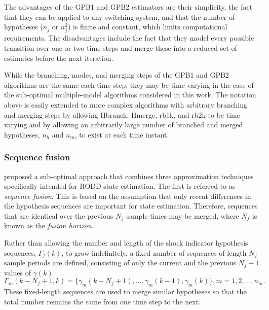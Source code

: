 The advantages of the \gls{GPB1} and \gls{GPB2} estimators are their simplicity, the fact that they can be applied to any switching system, and that the number of hypotheses ($n_j$ or $n_j^2$) is finite and constant, which limits computational requirements. The disadvantages include the fact that they model every possible transition over one or two time steps and merge these into a reduced set of estimates before the next iteration. 

While the branching, modes, and merging steps of the \gls{GPB1} and \gls{GPB2} algorithms are the same each time step, they may be time-varying in the case of the sub-optimal multiple-model algorithms considered in this work. The notation above is easily extended to more complex algorithms with arbitrary branching and merging steps by allowing \gls{Hbranch}, \gls{Hmerge}, \gls{rb1k}, and \gls{rb2k} to be time-varying and by allowing an arbitrarily large number of branched and merged hypotheses, $n_h$ and $n_m$, to exist at each time instant.

\subsubsection{Sequence fusion} \label{sec:fusion}

\cite{robertson_detection_1995} proposed a sub-optimal approach that combines three approximation techniques specifically intended for \gls{RODD} state estimation. The first is referred to as \textit{sequence fusion}. This is based on the assumption that only recent differences in the hypothesis sequences are important for state estimation. Therefore, sequences that are identical over the previous $N_f$ sample times may be merged, where $N_f$ is known as the \textit{fusion horizon}.
%

Rather than allowing the number and length of the shock indicator hypothesis sequences, $\Gamma_f(k)$, to grow indefinitely, a fixed number of sequences of length $N_f$ sample periods are defined, consisting of only the current and the previous $N_f-1$ values of $\gamma(k)$
%
\begin{equation} \label{eq:Gamma_kmf_k}
	\Gamma_m(k-N_f+1,k) = \{\gamma_m(k-N_f+1), ...,  \gamma_m(k-1), \gamma_m(k)\}, m=1,2,..., n_m.
\end{equation}
These fixed-length sequences are used to merge similar hypotheses so that the total number remains the same from one time step to the next.

